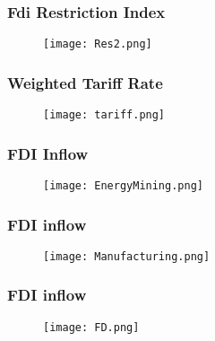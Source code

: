 \documentclass[xcolor=dvipsnames]{beamer}
\begin{document}
\begin{frame}
	\frametitle{ Fdi Restriction Index}
	\begin{figure}
		\begin{center}
			\texttt{[image: Res2.png]}
		\end{center}
	\end{figure}
\end{frame}

\begin{frame}
	\frametitle{Weighted Tariff Rate}
	\begin{figure}
		\begin{center}
			\texttt{[image: tariff.png]}
		\end{center}
	\end{figure}
\end{frame}

\begin{frame}
	\frametitle{FDI Inflow}
	\begin{figure}
		\begin{center}
			\texttt{[image: EnergyMining.png]}
		\end{center}
	\end{figure}
\end{frame}

\begin{frame}
	\frametitle{FDI inflow}
	\begin{figure}
		\begin{center}
			\texttt{[image: Manufacturing.png]}
		\end{center}
	\end{figure}
\end{frame}

\begin{frame}
	\frametitle{FDI inflow}
	\begin{figure}
		\begin{center}
			\texttt{[image: FD.png]}
		\end{center}
	\end{figure}
\end{frame}
\end{document}
